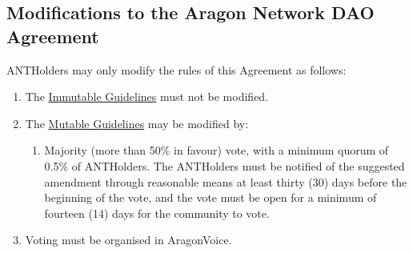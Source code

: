 \subsection{Modifications to the Aragon Network DAO Agreement}
\glspl{ANTHolder} may only modify the rules of this Agreement as follows:
\begin{enumerate}
	\item The \hyperref[sec:ImmutableGuidelines]{Immutable Guidelines} must not be modified.
	\item The \hyperref[sec:MutableGuidelines]{Mutable Guidelines} may be modified by:
	\begin{enumerate}
		\item Majority (more than 50\% in favour) vote, with a minimum quorum of 0.5\% of \glspl{ANTHolder}.
		The \glspl{ANTHolder} must be notified of the suggested amendment through reasonable means at least thirty (30) days before the beginning of the vote, and the vote must be open for a minimum of fourteen (14) days for the community to vote.
	\end{enumerate}
	\item  Voting must be organised in \gls{AragonVoice}.
\end{enumerate}

